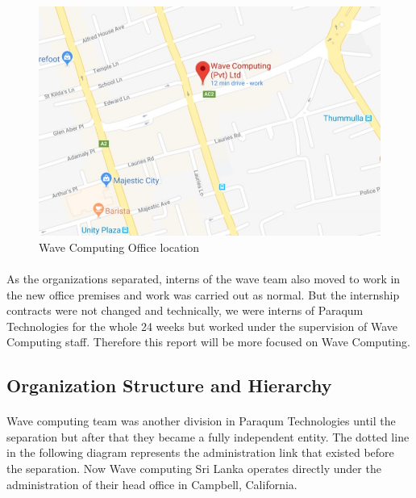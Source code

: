 \begin{figure}[h]
    \centering
    \includegraphics[trim=0cm 0cm 0cm 0cm, clip=true,scale=0.25]{figures/wave_location.jpg}
    \caption{Wave Computing Office location \label{Fig:pqmteam}}\vspace{-4mm}
    \end{figure}

\paragraph{}
As the organizations separated, interns of the wave team also moved to work in the new office premises and work was carried out as normal. But the internship contracts were not changed and technically, we were interns of Paraqum Technologies for the whole 24 weeks but worked under the supervision of Wave Computing staff. Therefore this report will be more focused on Wave Computing.

\subsection{Organization Structure and Hierarchy}

\paragraph{}
Wave computing team was another division in Paraqum Technologies until the separation but after that they became a fully independent entity. The dotted line in the following diagram represents the administration link that existed before the separation. Now Wave computing Sri Lanka operates directly under the administration of their head office in Campbell, California. 

